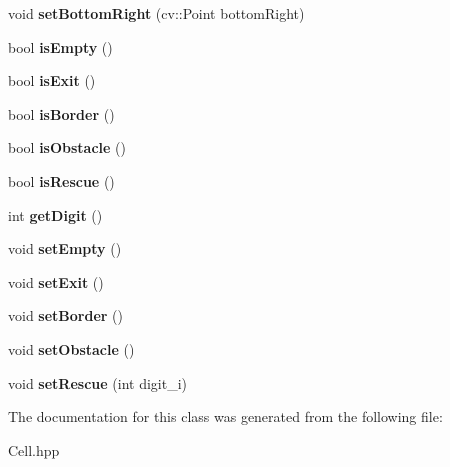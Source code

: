 \begin{DoxyCompactItemize}
void {\bfseries set\+Bottom\+Right} (cv\+::\+Point bottom\+Right)
\item 
\mbox{\label{class_cell_a6c7344ef2aa917e70364221bf86ff8bc}} 
bool {\bfseries is\+Empty} ()
\item 
\mbox{\label{class_cell_aaf13f5d308c7f1eb670a050e4fc6dc28}} 
bool {\bfseries is\+Exit} ()
\item 
\mbox{\label{class_cell_a34d62b7c65fd85f356bd9e2c3058edcb}} 
bool {\bfseries is\+Border} ()
\item 
\mbox{\label{class_cell_aee32093f779b1fa761b43a6b0a86ed6c}} 
bool {\bfseries is\+Obstacle} ()
\item 
\mbox{\label{class_cell_ad86a719c04ff04bdf79c1c0b8e5a5942}} 
bool {\bfseries is\+Rescue} ()
\item 
\mbox{\label{class_cell_a335c410074aaac9bb5594ea8adf648ff}} 
int {\bfseries get\+Digit} ()
\item 
\mbox{\label{class_cell_a6047939b792e819bc2330151ff98864f}} 
void {\bfseries set\+Empty} ()
\item 
\mbox{\label{class_cell_a9fa0a3c17d798320c78bffe44411008e}} 
void {\bfseries set\+Exit} ()
\item 
\mbox{\label{class_cell_aa690e62809d36d512cd39ccda9cea293}} 
void {\bfseries set\+Border} ()
\item 
\mbox{\label{class_cell_a34e953e7f720c3382f0b13c2480cafd0}} 
void {\bfseries set\+Obstacle} ()
\item 
\mbox{\label{class_cell_afa194cda3c1e8f9be100c9a14fda7f9d}} 
void {\bfseries set\+Rescue} (int digit\+\_\+i)
\end{DoxyCompactItemize}


The documentation for this class was generated from the following file\+:\begin{DoxyCompactItemize}
\item 
Cell.\+hpp\end{DoxyCompactItemize}
